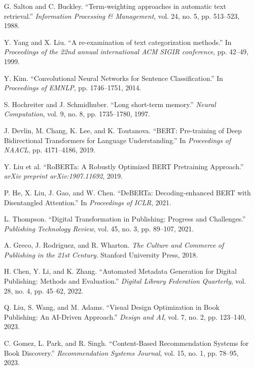 \documentclass{article}
\begin{document}
\begin{thebibliography}{99}
G. Salton and C. Buckley.
``Term-weighting approaches in automatic text retrieval.''
\textit{Information Processing \& Management}, vol. 24, no. 5, pp. 513--523, 1988.

Y. Yang and X. Liu.
``A re-examination of text categorization methods.''
In \textit{Proceedings of the 22nd annual international ACM SIGIR conference}, pp. 42--49, 1999.

Y. Kim.
``Convolutional Neural Networks for Sentence Classification.''
In \textit{Proceedings of EMNLP}, pp. 1746--1751, 2014.

S. Hochreiter and J. Schmidhuber.
``Long short-term memory.''
\textit{Neural Computation}, vol. 9, no. 8, pp. 1735--1780, 1997.

J. Devlin, M. Chang, K. Lee, and K. Toutanova.
``BERT: Pre-training of Deep Bidirectional Transformers for Language Understanding.''
In \textit{Proceedings of NAACL}, pp. 4171--4186, 2019.

Y. Liu et al.
``RoBERTa: A Robustly Optimized BERT Pretraining Approach.''
\textit{arXiv preprint arXiv:1907.11692}, 2019.

P. He, X. Liu, J. Gao, and W. Chen.
``DeBERTa: Decoding-enhanced BERT with Disentangled Attention.''
In \textit{Proceedings of ICLR}, 2021.

L. Thompson.
``Digital Transformation in Publishing: Progress and Challenges.''
\textit{Publishing Technology Review}, vol. 45, no. 3, pp. 89--107, 2021.

A. Greco, J. Rodriguez, and R. Wharton.
\textit{The Culture and Commerce of Publishing in the 21st Century}.
Stanford University Press, 2018.

H. Chen, Y. Li, and K. Zhang.
``Automated Metadata Generation for Digital Publishing: Methods and Evaluation.''
\textit{Digital Library Federation Quarterly}, vol. 28, no. 4, pp. 45--62, 2022.

Q. Liu, S. Wang, and M. Adams.
``Visual Design Optimization in Book Publishing: An AI-Driven Approach.''
\textit{Design and AI}, vol. 7, no. 2, pp. 123--140, 2023.

C. Gomez, L. Park, and R. Singh.
``Content-Based Recommendation Systems for Book Discovery.''
\textit{Recommendation Systems Journal}, vol. 15, no. 1, pp. 78--95, 2023.


\end{thebibliography}
\end{document}
